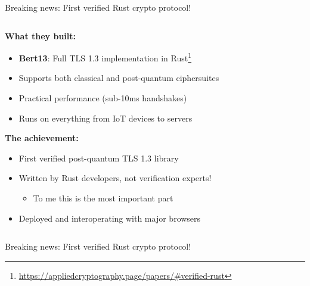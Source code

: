 \documentclass[aspectratio=169, lualatex, handout]{beamer}
\begin{document}
\begin{frame}{Breaking news: First verified Rust crypto protocol!}
	\begin{columns}[c]
		\begin{column}{1\textwidth}
			\textbf{What they built:}
			\begin{itemize}
				\item \textbf{Bert13}: Full TLS 1.3 implementation in Rust\footnote{\url{https://appliedcryptography.page/papers/\#verified-rust}}
				\item Supports both classical and post-quantum ciphersuites
				\item Practical performance (sub-10ms handshakes)
				\item Runs on everything from IoT devices to servers
			\end{itemize}
			\vspace{0.25em}
			\textbf{The achievement:}
			\begin{itemize}
				\item First verified post-quantum TLS 1.3 library
				\item Written by Rust developers, not verification experts!
				      \begin{itemize}
					      \item To me this is the most important part
				      \end{itemize}
				\item Deployed and interoperating with major browsers
			\end{itemize}
		\end{column}
	\end{columns}
\end{frame}

\begin{frame}{Breaking news: First verified Rust crypto protocol!}
\end{frame}
\end{document}
